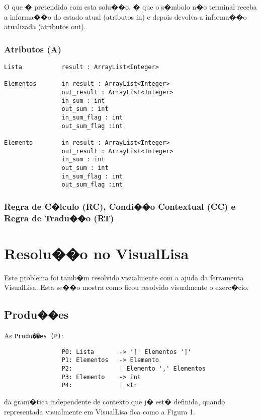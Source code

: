 \documentclass[a4paper]{article}
\begin{document}
O que � pretendido com esta solu��o, � que o s�mbolo n�o terminal receba a informa��o do estado 
atual (atributos in) e depois devolva a informa��o atualizada  (atributos out).

\subsubsection{Atributos (A)}
\begin{verbatim}
Lista           result : ArrayList<Integer>

Elementos       in_result : ArrayList<Integer>
                out_result : ArrayList<Integer>
                in_sum : int
                out_sum : int
                in_sum_flag : int
                out_sum_flag :int

Elemento        in_result : ArrayList<Integer>
                out_result : ArrayList<Integer>
                in_sum : int
                out_sum : int
                in_sum_flag : int
                out_sum_flag :int
\end{verbatim}

\subsubsection{Regra de C�lculo (RC), Condi��o Contextual (CC) e Regra de Tradu��o (RT)}



\section{Resolu��o no VisualLisa}
Este problema foi tamb�m resolvido visualmente com a ajuda da ferramenta VisualLisa.
Esta se��o mostra como ficou resolvido visualmente o exerc�cio.

\subsection{Produ��es}
As \verb|Produ��es (P)|:
\begin{verbatim}
                P0: Lista       -> '[' Elementos ']'
                P1: Elementos   -> Elemento 
                P2:             | Elemento ',' Elementos
                P3: Elemento    -> int
                P4:             | str
\end{verbatim}

da gram�tica independente de contexto que j� est� definida, 
quando representada visualmente em VisualLisa fica como a Figura 1.
\end{document}
